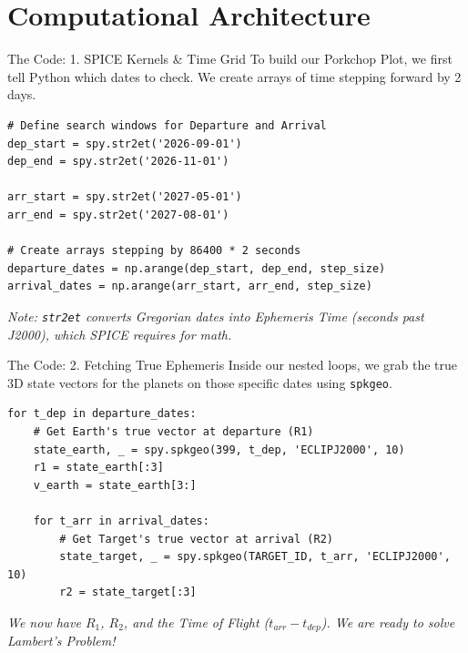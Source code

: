 \documentclass[11pt]{beamer}
\begin{document}
\section{Computational Architecture}

\begin{frame}[fragile]{The Code: 1. SPICE Kernels \& Time Grid}
    To build our Porkchop Plot, we first tell Python which dates to check. We create arrays of time stepping forward by 2 days.
    
\begin{lstlisting}
# Define search windows for Departure and Arrival
dep_start = spy.str2et('2026-09-01')
dep_end = spy.str2et('2026-11-01')

arr_start = spy.str2et('2027-05-01')
arr_end = spy.str2et('2027-08-01')

# Create arrays stepping by 86400 * 2 seconds
departure_dates = np.arange(dep_start, dep_end, step_size)
arrival_dates = np.arange(arr_start, arr_end, step_size)
\end{lstlisting}
    \textit{Note: \texttt{str2et} converts Gregorian dates into Ephemeris Time (seconds past J2000), which SPICE requires for math.}
\end{frame}

\begin{frame}[fragile]{The Code: 2. Fetching True Ephemeris}
    Inside our nested loops, we grab the true 3D state vectors for the planets on those specific dates using \texttt{spkgeo}.
    
\begin{lstlisting}
for t_dep in departure_dates:
    # Get Earth's true vector at departure (R1)
    state_earth, _ = spy.spkgeo(399, t_dep, 'ECLIPJ2000', 10)
    r1 = state_earth[:3]
    v_earth = state_earth[3:]
    
    for t_arr in arrival_dates:
        # Get Target's true vector at arrival (R2)
        state_target, _ = spy.spkgeo(TARGET_ID, t_arr, 'ECLIPJ2000', 10)
        r2 = state_target[:3]
\end{lstlisting}
    \textit{We now have $R_1$, $R_2$, and the Time of Flight ($t_{arr} - t_{dep}$). We are ready to solve Lambert's Problem!}
\end{frame}
\end{document}
